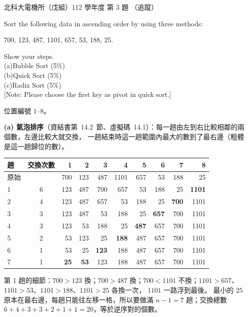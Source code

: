 \begin{pastexam}[label={px:ntut-112-ee-ds-03}]{北科大電機所（戊組）112 學年度 第 3 題}
（追蹤）

Sort the following data in ascending order by using three methods:
\begin{center}700, 123, 487, 1101, 657, 53, 188, 25.\end{center}
Show your steps.\\
(a)Bubble Sort (5\%)\\
(b)Quick Sort (5\%)\\
(c)Radix Sort (5\%)\\
\hspace*{1em}[Note: Please choose the first key as pivot in quick sort.]
\end{pastexam}

\begin{pastsoln}
位置編號 $1$--$8$。

\textbf{(a) 氣泡排序}（資結書第~14.2~節、虛擬碼~14.1）：每一趟由左到右比較相鄰的兩個數，左邊比較大就交換，
一趟結束時這一趟範圍內最大的數到了最右邊（粗體是這一趟歸位的數）。
\begin{center}
\small
\begin{tabular}{lc*{8}{r}}
\toprule
趟 & 交換次數 & 1 & 2 & 3 & 4 & 5 & 6 & 7 & 8 \\
\midrule
原始 & & 700 & 123 & 487 & 1101 & 657 & 53 & 188 & 25 \\
1 & 6 & 123 & 487 & 700 & 657 & 53 & 188 & 25 & \textbf{1101} \\
2 & 4 & 123 & 487 & 657 & 53 & 188 & 25 & \textbf{700} & 1101 \\
3 & 3 & 123 & 487 & 53 & 188 & 25 & \textbf{657} & 700 & 1101 \\
4 & 3 & 123 & 53 & 188 & 25 & \textbf{487} & 657 & 700 & 1101 \\
5 & 2 & 53 & 123 & 25 & \textbf{188} & 487 & 657 & 700 & 1101 \\
6 & 1 & 53 & 25 & \textbf{123} & 188 & 487 & 657 & 700 & 1101 \\
7 & 1 & \textbf{25} & \textbf{53} & 123 & 188 & 487 & 657 & 700 & 1101 \\
\bottomrule
\end{tabular}
\end{center}
第 1 趟的細節：$700 > 123$ 換；$700 > 487$ 換；$700 < 1101$ 不換；$1101 > 657$、$1101 > 53$、$1101 > 188$、$1101 > 25$ 各換一次，
$1101$ 一路浮到最後。 最小的 $25$ 原本在最右邊，每趟只能往左移一格，所以要做滿 $n - 1 = 7$ 趟；交換總數
$6 + 4 + 3 + 3 + 2 + 1 + 1 = 20$，等於逆序對的個數。


\end{pastsoln}
